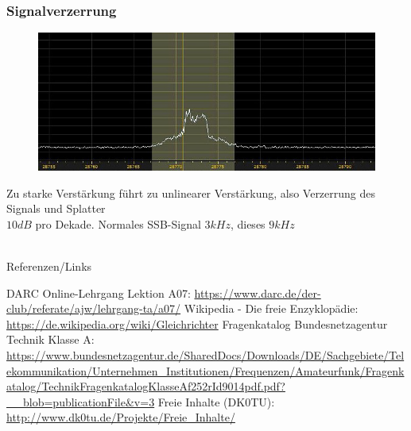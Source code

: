 \begin{frame}
  \frametitle{Signalverzerrung}
  \begin{center}
    \begin{figure}
      \includegraphics[width=1\textwidth,height=.5\textheight,keepaspectratio]{a07/splatter.jpg}
    \end{figure}
    Zu starke Verstärkung führt zu unlinearer Verstärkung, also Verzerrung des Signals und Splatter\\
    $10dB$ pro Dekade. Normales SSB-Signal $3kHz$, dieses $9kHz$
  \end{center}
\end{frame}

\renewcommand{\refname}{Referenzen}

\hypertarget{refs}{}
\textcolor{white}{} \\ %
\Large Referenzen/Links
\footnotesize

\begin{thebibliography}{}
    DARC Online-Lehrgang Lektion A07:
    \url{https://www.darc.de/der-club/referate/ajw/lehrgang-ta/a07/}
      Wikipedia - Die freie Enzyklopädie:
    \url{https://de.wikipedia.org/wiki/Gleichrichter}
     Fragenkatalog Bundesnetzagentur Technik Klasse A:
    \url{https://www.bundesnetzagentur.de/SharedDocs/Downloads/DE/Sachgebiete/Telekommunikation/Unternehmen_Institutionen/Frequenzen/Amateurfunk/Fragenkatalog/TechnikFragenkatalogKlasseAf252rId9014pdf.pdf?__blob=publicationFile&v=3}
      Freie Inhalte (DK0TU):
    \url{http://www.dk0tu.de/Projekte/Freie_Inhalte/}
\end{thebibliography}


